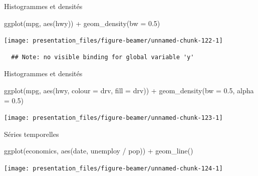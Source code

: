 \documentclass[12pt,ignorenonframetext,handout,]{beamer}
\newenvironment{Shaded}{}{}
\newcommand{\DataTypeTok}[1]{#1}
\newcommand{\FloatTok}[1]{#1}
\newcommand{\KeywordTok}[1]{\textcolor[rgb]{0.00,0.00,1.00}{#1}}
\newcommand{\NormalTok}[1]{#1}
\newcommand{\OperatorTok}[1]{#1}
\newcommand{\StringTok}[1]{\textcolor[rgb]{0.00,0.50,0.50}{#1}}
\renewenvironment{Shaded}{\begin{snugshade}}{\end{snugshade}}
\begin{document}
\begin{frame}[fragile]{Histogrammes et densités}
\protect\hypertarget{histogrammes-et-densites-5}{}

\footnotesize \center

\begin{Shaded}
\begin{Highlighting}[]
\KeywordTok{ggplot}\NormalTok{(mpg, }\KeywordTok{aes}\NormalTok{(hwy)) }\OperatorTok{+}\StringTok{ }\KeywordTok{geom_density}\NormalTok{(}\DataTypeTok{bw =} \FloatTok{0.5}\NormalTok{)}
\end{Highlighting}
\end{Shaded}

\texttt{[image: presentation\_files/figure-beamer/unnamed-chunk-122-1]}

\begin{verbatim}
  ## Note: no visible binding for global variable 'y'
\end{verbatim}

\end{frame}

\begin{frame}[fragile]{Histogrammes et densités}
\protect\hypertarget{histogrammes-et-densites-6}{}

\footnotesize \center

\begin{Shaded}
\begin{Highlighting}[]
\KeywordTok{ggplot}\NormalTok{(mpg, }\KeywordTok{aes}\NormalTok{(hwy, }\DataTypeTok{colour =}\NormalTok{ drv, }\DataTypeTok{fill =}\NormalTok{ drv)) }\OperatorTok{+}\StringTok{ }
\StringTok{  }\KeywordTok{geom_density}\NormalTok{(}\DataTypeTok{bw =} \FloatTok{0.5}\NormalTok{, }\DataTypeTok{alpha =} \FloatTok{0.5}\NormalTok{)}
\end{Highlighting}
\end{Shaded}

\texttt{[image: presentation\_files/figure-beamer/unnamed-chunk-123-1]}

\end{frame}

\begin{frame}[fragile]{Séries temporelles}
\protect\hypertarget{series-temporelles}{}

\footnotesize \center

\begin{Shaded}
\begin{Highlighting}[]
\KeywordTok{ggplot}\NormalTok{(economics, }\KeywordTok{aes}\NormalTok{(date, unemploy }\OperatorTok{/}\StringTok{ }\NormalTok{pop)) }\OperatorTok{+}
\StringTok{  }\KeywordTok{geom_line}\NormalTok{()}
\end{Highlighting}
\end{Shaded}

\texttt{[image: presentation\_files/figure-beamer/unnamed-chunk-124-1]}

\end{frame}
\end{document}
